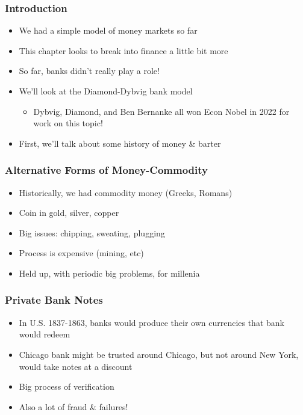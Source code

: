 \documentclass{beamer}
\author{Trevor S. Gallen}
\date{}
\begin{document}
\renewcommand*{\inserttotalframenumber}{\pageref{lastframe}}



\begin{frame}
\titlepage
\end{frame}

\begin{frame}
\frametitle[alignment=center]{Introduction}
\begin{itemize}
\item We had a simple model of money markets so far
\bigskip
\item This chapter looks to break into finance a little bit more
\bigskip
\item So far, banks didn't really play a role!
\bigskip
\item We'll look at the Diamond-Dybvig bank model
\begin{itemize}
\item Dybvig, Diamond, and Ben Bernanke all won Econ Nobel  in 2022 for work on this topic!
\end{itemize}
\bigskip
\item First, we'll talk about some history of money \& barter
\end{itemize}
\end{frame}


\begin{frame}
\frametitle[alignment=center]{Alternative Forms of Money-Commodity}
\begin{itemize}
\item Historically, we had commodity money (Greeks, Romans)
\bigskip
\item Coin in gold, silver, copper
\bigskip
\item Big issues:  chipping, sweating, plugging
\bigskip
\item Process is expensive (mining, etc)
\bigskip
\item Held up, with periodic big problems, for millenia
\end{itemize}
\end{frame}

\begin{frame}
\frametitle[alignment=center]{Private Bank Notes}
\begin{itemize}
\item In U.S. 1837-1863, banks would produce their own currencies that bank would redeem
\bigskip
\item Chicago bank might be trusted around Chicago, but not around New York, would take notes at a discount
\bigskip
\item Big process of verification
\bigskip
\item Also a lot of fraud \& failures!
\end{itemize}
\end{frame}
\end{document}
